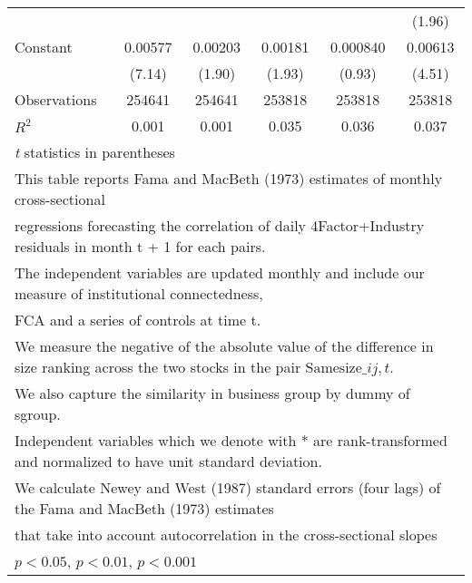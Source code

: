 {\begin{tabular}{l*{5}{c}}
                &                  &                  &                  &                  &   (1.96)         \\
[1em]
Constant        &  0.00577\sym{***}&  0.00203         &  0.00181         & 0.000840         &  0.00613\sym{***}\\
                &   (7.14)         &   (1.90)         &   (1.93)         &   (0.93)         &   (4.51)         \\
\hline
Observations    &   254641         &   254641         &   253818         &   253818         &   253818         \\
\(R^{2}\)       &    0.001         &    0.001         &    0.035         &    0.036         &    0.037         \\
\hline\hline
\multicolumn{6}{l}{\footnotesize \textit{t} statistics in parentheses}\\
\multicolumn{6}{l}{\footnotesize This table reports Fama and MacBeth (1973) estimates of monthly cross-sectional}\\
\multicolumn{6}{l}{\footnotesize  regressions forecasting the correlation of daily 4Factor+Industry residuals in month t + 1 for each pairs.}\\
\multicolumn{6}{l}{\footnotesize The independent variables are updated monthly and include our measure of institutional connectedness,}\\
\multicolumn{6}{l}{\footnotesize  FCA and a series of controls at time t.}\\
\multicolumn{6}{l}{\footnotesize We measure the negative of the absolute value of the difference in size ranking across the two stocks in the pair $ \text{Samesize}\_{ij,t} $.}\\
\multicolumn{6}{l}{\footnotesize We also capture the similarity in business group by dummy of sgroup.}\\
\multicolumn{6}{l}{\footnotesize Independent variables which  we denote with * are rank-transformed and normalized to have unit standard deviation.}\\
\multicolumn{6}{l}{\footnotesize  We calculate Newey and West (1987) standard errors (four lags) of the Fama and MacBeth (1973) estimates }\\
\multicolumn{6}{l}{\footnotesize  that take into account autocorrelation in the cross-sectional slopes}\\
\multicolumn{6}{l}{\footnotesize \sym{*} \(p<0.05\), \sym{**} \(p<0.01\), \sym{***} \(p<0.001\)}\\
\end{tabular}
}
